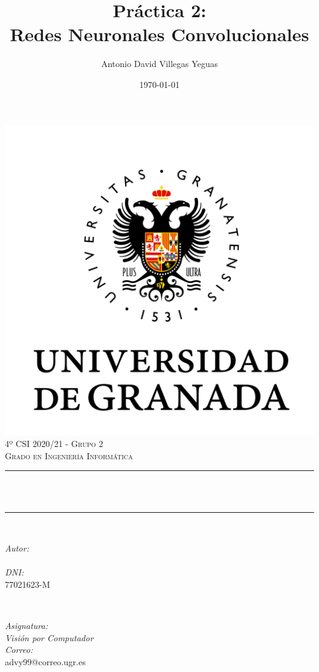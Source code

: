 \documentclass[12pt, spanish]{article}
\title{Práctica 2:\\
Redes Neuronales Convolucionales \hspace{0.05cm} }
\author{Antonio David Villegas Yeguas}
\date{\today}
\makeatletter
\let\thetitle\@title
\let\theauthor\@author
\makeatother
\begin{document}

\begin{titlepage}
    \centering
    \vspace*{0.3 cm}
    \includegraphics[scale = 0.50]{ugr.png}\\[0.7 cm]
    \textsc{\large 4º CSI 2020/21 - Grupo 2}\\[0.5 cm]
    \textsc{\large Grado en Ingeniería Informática}\\[0.5 cm]
    \rule{\linewidth}{0.2 mm} \\[0.2 cm]
    { \huge \bfseries \thetitle}\\
    \rule{\linewidth}{0.2 mm} \\[1 cm]

    \begin{minipage}{0.4\textwidth}
        \begin{flushleft} \large
            \emph{Autor:}\\
            \theauthor\\
			 \emph{DNI:}\\
            77021623-M
            \end{flushleft}
            \end{minipage}~
            \begin{minipage}{0.4\textwidth}
            \begin{flushright} \large
            \emph{Asignatura: \\
            Visión por Computador}   \\
            \emph{Correo:}\\
            advy99@correo.ugr.es
        \end{flushright}
    \end{minipage}\\[0.5cm]


\end{titlepage}
\end{document}
